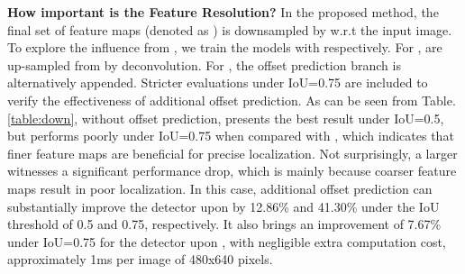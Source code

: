\documentclass[review]{elsarticle}
\begin{document}
\begin{table*}
\begin{center}
\end{center}

\caption{Comparisons of different combinations of multi-scale feature representations defined in Sec. \ref{sec:arc}. , ,  and  represent the output of \emph{stage 2, 3, 4 and 5} of a backbone network, respectively.  Bold numbers indicate the best results.}
\label{table:featcom}

\end{table*}

\textbf{How important is the Feature Resolution?}
In the proposed method, the final set of feature maps (denoted as ) is downsampled by  w.r.t the input image. To explore the influence from , we train the models with  respectively. For ,  are up-sampled from  by deconvolution. For , the offset prediction branch is alternatively appended.
Stricter evaluations under IoU=0.75 are included to verify the effectiveness of additional offset prediction.
As can be seen from Table. \ref{table:down}, without offset prediction,  presents the best result under IoU=0.5, but performs poorly under IoU=0.75 when compared with , which indicates that finer feature maps are beneficial for precise localization. Not surprisingly, a larger  witnesses a significant performance drop, which is mainly because coarser feature maps result in poor localization. In this case, additional offset prediction can substantially improve the detector upon  by 12.86\% and 41.30\% under the IoU threshold of 0.5 and 0.75, respectively. It also brings an improvement of 7.67\% under IoU=0.75 for the detector upon , with negligible extra computation cost, approximately 1ms per image of 480x640 pixels.
\end{document}
